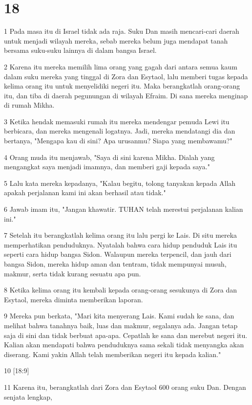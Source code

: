 \chapter{18}

\par 1 Pada masa itu di Israel tidak ada raja. Suku Dan masih mencari-cari daerah untuk menjadi wilayah mereka, sebab mereka belum juga mendapat tanah bersama suku-suku lainnya di dalam bangsa Israel.
\par 2 Karena itu mereka memilih lima orang yang gagah dari antara semua kaum dalam suku mereka yang tinggal di Zora dan Esytaol, lalu memberi tugas kepada kelima orang itu untuk menyelidiki negeri itu. Maka berangkatlah orang-orang itu, dan tiba di daerah pegunungan di wilayah Efraim. Di sana mereka menginap di rumah Mikha.
\par 3 Ketika hendak memasuki rumah itu mereka mendengar pemuda Lewi itu berbicara, dan mereka mengenali logatnya. Jadi, mereka mendatangi dia dan bertanya, "Mengapa kau di sini? Apa urusanmu? Siapa yang membawamu?"
\par 4 Orang muda itu menjawab, "Saya di sini karena Mikha. Dialah yang mengangkat saya menjadi imamnya, dan memberi gaji kepada saya."
\par 5 Lalu kata mereka kepadanya, "Kalau begitu, tolong tanyakan kepada Allah apakah perjalanan kami ini akan berhasil atau tidak."
\par 6 Jawab imam itu, "Jangan khawatir. TUHAN telah merestui perjalanan kalian ini."
\par 7 Setelah itu berangkatlah kelima orang itu lalu pergi ke Lais. Di situ mereka memperhatikan penduduknya. Nyatalah bahwa cara hidup penduduk Lais itu seperti cara hidup bangsa Sidon. Walaupun mereka terpencil, dan jauh dari bangsa Sidon, mereka hidup aman dan tentram, tidak mempunyai musuh, makmur, serta tidak kurang sesuatu apa pun.
\par 8 Ketika kelima orang itu kembali kepada orang-orang sesukunya di Zora dan Esytaol, mereka diminta memberikan laporan.
\par 9 Mereka pun berkata, "Mari kita menyerang Lais. Kami sudah ke sana, dan melihat bahwa tanahnya baik, luas dan makmur, segalanya ada. Jangan tetap saja di sini dan tidak berbuat apa-apa. Cepatlah ke sana dan merebut negeri itu. Kalian akan mendapati bahwa penduduknya sama sekali tidak menyangka akan diserang. Kami yakin Allah telah memberikan negeri itu kepada kalian."
\par 10 [18:9]
\par 11 Karena itu, berangkatlah dari Zora dan Esytaol 600 orang suku Dan. Dengan senjata lengkap,
